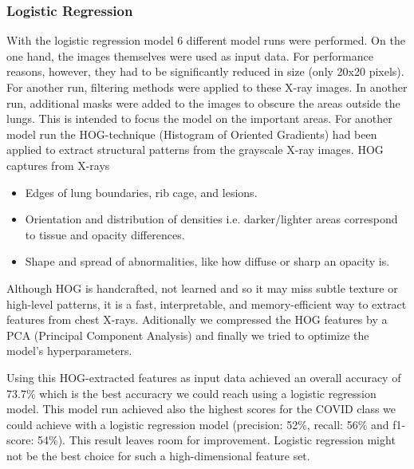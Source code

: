 \documentclass{article}
\begin{document}

\subsubsection{Logistic Regression}
With the logistic regression model 6 different model runs were performed. On the one hand, the images themselves were used as input data. For performance reasons, however, they had to be significantly reduced in size (only 20x20 pixels). For another run, filtering methods were applied to these X-ray images. In another run, additional masks were added to the images to obscure the areas outside the lungs. This is intended to focus the model on the important areas. 
For another model run the HOG-technique (Histogram of Oriented Gradients) had been applied to extract structural patterns from the grayscale X-ray images. HOG captures from X-rays
\begin{itemize}
     \item Edges of lung boundaries, rib cage, and lesions.
     \item Orientation and distribution of densities i.e. darker/lighter areas correspond to tissue and opacity differences.
     \item Shape and spread of abnormalities, like how diffuse or sharp an opacity is.
\end{itemize}
Although HOG is handcrafted, not learned  and  so it may miss subtle texture or high-level patterns, it is a fast, interpretable, and memory-efficient way to extract features from chest X-rays. 
Aditionally we compressed the HOG features by a PCA (Principal Component Analysis) and finally we tried to optimize the model's hyperparameters. 

Using this HOG-extracted features as input data achieved an overall accuracy of 73.7\% which is the best accuracry we could reach using a logistic regression model. This model run achieved also the highest scores for the COVID class we could achieve with a logistic regression model (precision: 52\%, recall: 56\% and f1-score: 54\%). This result leaves room for improvement. Logistic regression might not be the best choice for such a high-dimensional feature set.\\
\end{document}
